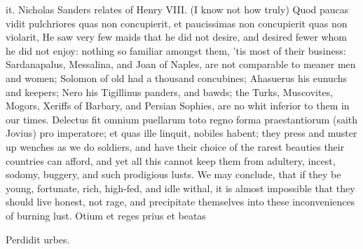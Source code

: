 {it. Nicholas Sanders relates of Henry VIII. (I know not how
truly) Quod paucas vidit pulchriores quas non concupierit, et
paucissimas non concupierit quas non violarit, He saw very few maids
that he did not desire, and desired fewer whom he did not enjoy:
nothing so familiar amongst them, 'tis most of their business:
Sardanapalus, Messalina, and Joan of Naples, are not comparable to
meaner men and women; Solomon of old had a thousand concubines;
Ahasuerus his eunuchs and keepers; Nero his Tigillinus panders, and
bawds; the Turks,  Muscovites, Mogors, Xeriffs of Barbary, and
Persian Sophies, are no whit inferior to them in our times. Delectus
fit omnium puellarum toto regno forma praestantiorum (saith Jovius) pro
imperatore; et quas ille linquit, nobiles habent; they press and muster
up wenches as we do soldiers, and have their choice of the rarest
beauties their countries can afford, and yet all this cannot keep them
from adultery, incest, sodomy, buggery, and such prodigious lusts. We
may conclude, that if they be young, fortunate, rich, high-fed, and
idle withal, it is almost impossible that they should live honest, not
rage, and precipitate themselves into these inconveniences of burning
lust.
Otium et reges prius et beatas

Perdidit urbes.

}
